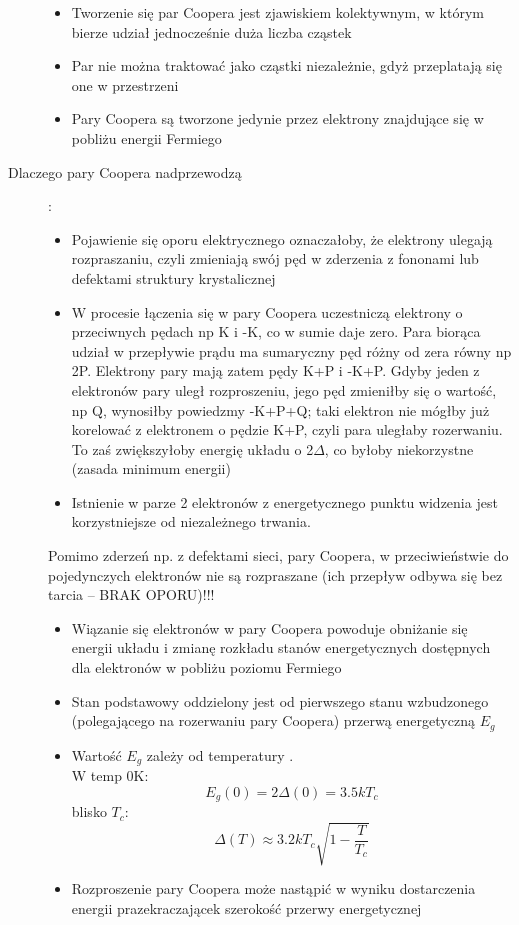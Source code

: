 \documentclass[a4paper,11pt]{article}
\begin{document}
\begin{description}
\begin{itemize}
  \item Tworzenie się par Coopera jest zjawiskiem kolektywnym, w którym bierze udział jednocześnie duża liczba cząstek
  \item Par nie można traktować jako cząstki niezależnie, gdyż przeplatają się one w przestrzeni
  \item Pary Coopera są tworzone jedynie przez elektrony znajdujące się w pobliżu energii Fermiego
  \end{itemize}
\item[Dlaczego pary Coopera nadprzewodzą]:
  \begin{itemize}
  \item Pojawienie się oporu elektrycznego oznaczałoby, że elektrony ulegają rozpraszaniu, czyli zmieniają swój pęd w zderzenia z fononami lub defektami struktury krystalicznej
  \item W procesie łączenia się w pary Coopera uczestniczą elektrony o przeciwnych pędach np K i -K, co w sumie daje zero. Para biorąca udział w przepływie prądu ma sumaryczny pęd różny od zera równy np 2P. Elektrony pary mają zatem pędy K+P i -K+P. Gdyby jeden z elektronów pary uległ rozproszeniu, jego pęd zmieniłby się o wartość, np Q, wynosiłby powiedzmy -K+P+Q; taki elektron nie mógłby już korelować z elektronem o pędzie K+P, czyli para uległaby rozerwaniu. To zaś zwiększyłoby energię układu o 2$\Delta$, co byłoby niekorzystne (zasada minimum energii)
  \item Istnienie w parze 2 elektronów z energetycznego punktu widzenia jest korzystniejsze od niezależnego trwania.
  \end{itemize}
  Pomimo zderzeń np. z defektami sieci, pary Coopera, w przeciwieństwie do pojedynczych elektronów nie są rozpraszane (ich przepływ odbywa się bez tarcia -- BRAK OPORU)!!!
  \begin{itemize}
  \item Wiązanie się elektronów w pary Coopera powoduje obniżanie się energii układu i zmianę rozkładu stanów energetycznych dostępnych dla elektronów w pobliżu poziomu Fermiego
  \item Stan podstawowy oddzielony jest od pierwszego stanu wzbudzonego (polegającego na rozerwaniu pary Coopera) przerwą energetyczną $E_g$
  \item Wartość $E_g$ zależy od temperatury .\\
    W temp 0K:
    $$E_g(0) = 2\Delta(0)=3.5kT_c$$
    blisko $T_c$:
    $$\Delta(T)\approx 3.2kT_c\sqrt{1-\frac{T}{T_c}}$$
  \item Rozproszenie pary Coopera może nastąpić w wyniku dostarczenia energii prazekraczającek szerokość przerwy energetycznej

\end{itemize}
\end{description}
\end{document}
